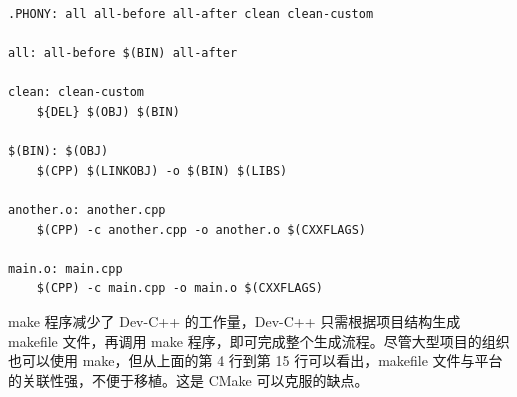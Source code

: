 \begin{enumerate}
\begin{lstlisting}[language={[gnu]make}]
.PHONY: all all-before all-after clean clean-custom

all: all-before $(BIN) all-after

clean: clean-custom
	${DEL} $(OBJ) $(BIN)

$(BIN): $(OBJ)
	$(CPP) $(LINKOBJ) -o $(BIN) $(LIBS)

another.o: another.cpp
	$(CPP) -c another.cpp -o another.o $(CXXFLAGS)

main.o: main.cpp
	$(CPP) -c main.cpp -o main.o $(CXXFLAGS)
	\end{lstlisting}

	make 程序减少了 Dev-C++ 的工作量，Dev-C++ 只需根据项目结构生成 makefile 文件，再调用 make 程序，即可完成整个生成流程。尽管大型项目的组织也可以使用 make，但从上面的第 4 行到第 15 行可以看出，makefile 文件与平台的关联性强，不便于移植。这是 CMake 可以克服的缺点。
\end{enumerate}
